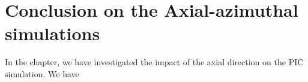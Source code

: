 
\section{Conclusion on the Axial-azimuthal simulations}

In the chapter, we have investigated the impact of the axial direction on the \ac{PIC} simulation.
We have 